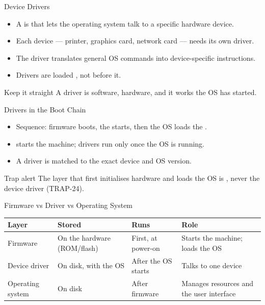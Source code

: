 \documentclass[aspectratio=169]{beamer}
\begin{document}
\begin{frame}{Device Drivers}
  \begin{itemize}
    \item A  is  that lets the operating
      system talk to a specific hardware device.
    \item Each device --- printer, graphics card, network card --- needs its
      own driver.
    \item The driver translates general OS commands into device-specific
      instructions.
    \item Drivers are loaded , not before it.
  \end{itemize}
  \begin{block}{Keep it straight}
    A driver is software,  hardware, and it works  the OS
    has started.
  \end{block}
\end{frame}

\begin{frame}{Drivers in the Boot Chain}
  \begin{itemize}
    \item Sequence: firmware boots, the  starts, then the OS loads
      the .
    \item {} starts the machine; drivers run only once the OS is
      running.
    \item A driver is matched to the exact device and OS version.
  \end{itemize}
  \begin{alertblock}{Trap alert}
    The layer that first initialises hardware and loads the OS is
    , never the device driver (TRAP-24).
  \end{alertblock}
\end{frame}

\begin{frame}{Firmware vs Driver vs Operating System}
  \begin{center}
    \begin{tabular}{p{}p{}p{}p{}}
      \toprule
      \textbf{Layer} & \textbf{Stored} & \textbf{Runs} & \textbf{Role} \\
      \midrule
      Firmware & On the hardware (ROM/flash) & First, at power-on & Starts the machine; loads the OS \\
      Device driver & On disk, with the OS & After the OS starts & Talks to one device \\
      Operating system & On disk & After firmware & Manages resources and the user interface \\
      \bottomrule
    \end{tabular}
  \end{center}
  \vspace{0.25cm}
\end{frame}
\end{document}
